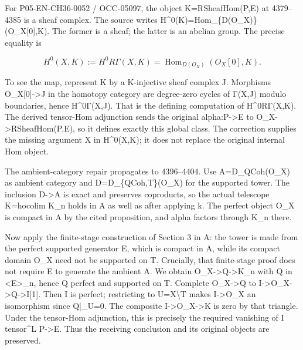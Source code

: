 For P05-EN-CH36-0052 /\allowbreak{} OCC-05097,\allowbreak{} the object K\allowbreak{}=RSheafHom(P,\allowbreak{}E)\allowbreak{} at 4379–\allowbreak{}4385 is a sheaf complex. The source writes H\textasciicircum{}0(K)\allowbreak{}\allowbreak{}=Hom\_\allowbreak{}\{D(O\_\allowbreak{}X)\allowbreak{}\}(O\_\allowbreak{}X[0]\allowbreak{},\allowbreak{}K)\allowbreak{}. The former is a sheaf; the latter is an abelian group. The precise equality is

\[
 H^0(X,K):=H^0R\Gamma(X,K)
      =\operatorname{Hom}_{D(O_X)}(O_X[0],K).
\]

To see the map,\allowbreak{} represent K by a K-injective sheaf complex J. Morphisms O\_\allowbreak{}X[0]\allowbreak{}\allowbreak{}->J in the homotopy category are degree-zero cycles of Γ(X,\allowbreak{}J)\allowbreak{} modulo boundaries,\allowbreak{} hence H\textasciicircum{}0Γ(X,\allowbreak{}J)\allowbreak{}. That is the defining computation of H\textasciicircum{}0RΓ(X,\allowbreak{}K)\allowbreak{}. The derived tensor-Hom adjunction sends the original alpha:\allowbreak{}P\allowbreak{}->E to O\_\allowbreak{}X\allowbreak{}->RSheafHom(P,\allowbreak{}E)\allowbreak{},\allowbreak{} so it defines exactly this global class. The correction supplies the missing argument X in H\textasciicircum{}0(X,\allowbreak{}K)\allowbreak{}; it does not replace the original internal Hom object.

The ambient-category repair propagates to 4396–\allowbreak{}4404. Use A\allowbreak{}=D\_\allowbreak{}QCoh(O\_\allowbreak{}X)\allowbreak{} as ambient category and D\allowbreak{}=D\_\allowbreak{}\{QCoh,\allowbreak{}T\}(O\_\allowbreak{}X)\allowbreak{} for the supported tower. The inclusion D\allowbreak{}->A is exact and preserves coproducts,\allowbreak{} so the actual telescope K\allowbreak{}=hocolim K\_\allowbreak{}n holds in A as well as after applying k. The perfect object O\_\allowbreak{}X is compact in A by the cited proposition,\allowbreak{} and alpha factors through K\_\allowbreak{}n there.

Now apply the finite-stage construction of Section 3 in A:\allowbreak{} the tower is made from the perfect supported generator E,\allowbreak{} which is compact in A,\allowbreak{} while its compact domain O\_\allowbreak{}X need not be supported on T. Crucially,\allowbreak{} that finite-stage proof does not require E to generate the ambient A. We obtain O\_\allowbreak{}X\allowbreak{}->Q\allowbreak{}->K\_\allowbreak{}n with Q in <E>\_\allowbreak{}n,\allowbreak{} hence Q perfect and supported on T. Complete O\_\allowbreak{}X\allowbreak{}->Q to I\allowbreak{}->O\_\allowbreak{}X\allowbreak{}->Q\allowbreak{}->I[1]\allowbreak{}. Then I is perfect; restricting to U\allowbreak{}=X\textbackslash{}T makes I\allowbreak{}->O\_\allowbreak{}X an isomorphism since Q|\_\allowbreak{}U\allowbreak{}=0. The composite I\allowbreak{}->O\_\allowbreak{}X\allowbreak{}->K is zero by that triangle. Under the tensor-Hom adjunction,\allowbreak{} this is precisely the required vanishing of I tensor\^{}L P\allowbreak{}->E. Thus the receiving conclusion and its original objects are preserved.

